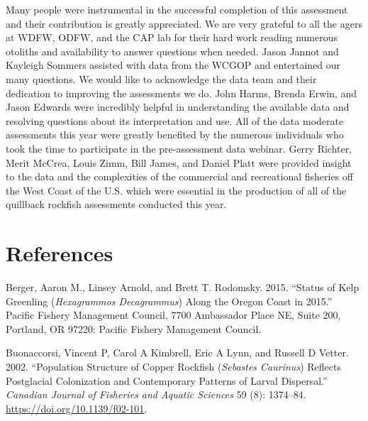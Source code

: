 \documentclass[11pt,
  english,
  a4paper,
]{article}
\begin{document}
Many people were instrumental in the successful completion of this assessment and their contribution is greatly appreciated. We are very grateful to all the agers at WDFW, ODFW, and the CAP lab for their hard work reading numerous otoliths and availability to answer questions when needed. Jason Jannot and Kayleigh Sommers assisted with data from the WCGOP and entertained our many questions. We would like to acknowledge the data team and their dedication to improving the assessments we do. John Harms, Brenda Erwin, and Jason Edwards were incredibly helpful in understanding the available data and resolving questions about its interpretation and use. All of the data moderate assessments this year were greatly benefited by the numerous individuals who took the time to participate in the pre-assessment data webinar. Gerry Richter, Merit McCrea, Louis Zimm, Bill James, and Daniel Platt were provided insight to the data and the complexities of the commercial and recreational fisheries off the West Coast of the U.S. which were essential in the production of all of the quillback rockfish assessments conducted this year.

\leavevmode\tagmcend\tagstructend\par

\clearpage


\hypertarget{references}{%
\section{References}\label{references}}

\leavevmode\tagmcend\tagstructend


\hypertarget{refs}{}
\leavevmode\hypertarget{ref-berger_kelpgreenling_2015}{}%
Berger, Aaron M., Linsey Arnold, and Brett T. Rodomsky. 2015. ``Status of Kelp Greenling (\emph{Hexagrammos Decagrammus}) Along the Oregon Coast in 2015.'' Pacific Fishery Management Council, 7700 Ambassador Place NE, Suite 200, Portland, OR 97220: Pacific Fishery Management Council.

\leavevmode\hypertarget{ref-buonaccorsi_population_2002}{}%
Buonaccorsi, Vincent P, Carol A Kimbrell, Eric A Lynn, and Russell D Vetter. 2002. ``Population Structure of Copper Rockfish (\emph{Sebastes Caurinus}) Reflects Postglacial Colonization and Contemporary Patterns of Larval Dispersal.'' \emph{Canadian Journal of Fisheries and Aquatic Sciences} 59 (8): 1374--84. \url{https://doi.org/10.1139/f02-101}.
\end{document}
